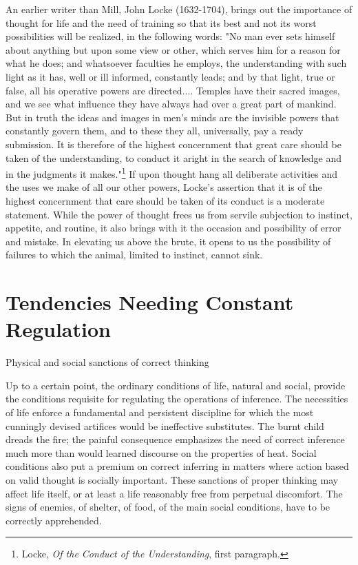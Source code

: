 \documentclass[letterpaper]{book}
\begin{document}
An earlier writer than Mill, John Locke (1632-1704), brings out the
importance of thought for life and the need of training so that its best
and not its worst possibilities will be realized, in the following
words: "No man ever sets himself about anything but upon some view or
other, which serves him for a reason for what he does; and whatsoever
faculties he employs, the understanding with such light as it has, well
or ill informed, constantly leads; and by that light, true or false, all
his operative powers are directed.... Temples have their sacred images,
and we see what influence they have always had over a great part of
mankind. But in truth the ideas and images in men's minds are the
invisible powers that constantly govern them, and to these they all,
universally, pay a ready submission. It is therefore of the highest
concernment that great care should be taken of the understanding, to
conduct it aright in the search of knowledge and in the judgments it
makes."\footnote{Locke, \emph{Of the Conduct of the Understanding}, first paragraph.}
If upon thought hang all deliberate activities and the uses we make of
all our other powers, Locke's assertion that it is of the highest
concernment that care should be taken of its conduct is a moderate
statement. While the power of thought frees us from servile subjection
to instinct, appetite, and routine, it also brings with it the occasion
and possibility of error and mistake. In elevating us above the brute,
it opens to us the possibility of failures to which the animal, limited
to instinct, cannot sink.

\section{Tendencies Needing Constant Regulation}

Physical and social sanctions of correct thinking

Up to a certain point, the ordinary conditions of life, natural and
social, provide the conditions requisite for regulating the operations
of inference. The necessities of life enforce a fundamental and
persistent discipline for which the most cunningly devised artifices
would be ineffective substitutes. The burnt child dreads the fire; the
painful consequence emphasizes the need of correct inference much more
than would learned discourse on the properties of heat. Social
conditions also put a premium on correct inferring in matters where
action based on valid thought is socially important. These sanctions of
proper thinking may affect life itself, or at least a life reasonably
free from perpetual discomfort. The signs of enemies, of shelter, of
food, of the main social conditions, have to be correctly apprehended.
\end{document}
